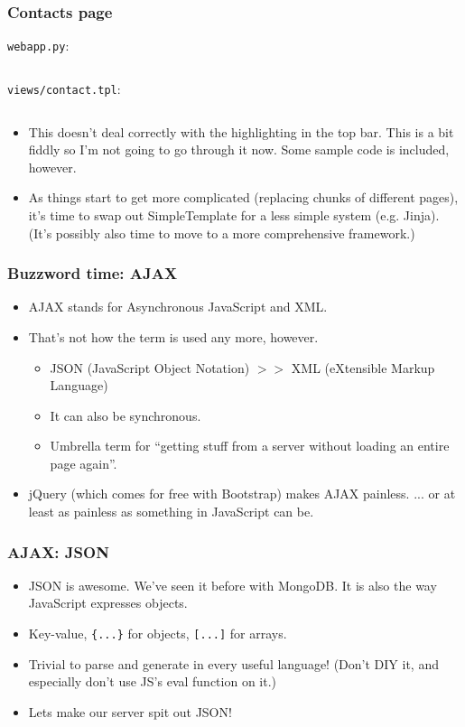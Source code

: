 \documentclass{beamer}
\begin{document}
\begin{frame}
  \frametitle{Contacts page}
  \texttt{webapp.py}:
  \inputminted[firstline=34,lastline=38]{python}{../steps/03-frontend/02-demo-app/webapp.py}
  \texttt{views/contact.tpl}:
  \inputminted{html}{../steps/03-frontend/02-demo-app/views/contact.tpl}
\end{frame}

\begin{frame}
  \begin{itemize}
  \item This doesn't deal correctly with the highlighting in the top
    bar. This is a bit fiddly so I'm not going to go through it
    now. Some sample code is included, however.
  \item As things start to get more complicated (replacing chunks of
    different pages), it's time to swap out SimpleTemplate for a less
    simple system (e.g. Jinja). (It's possibly also time to move to a
    more comprehensive framework.)
  \end{itemize}
\end{frame}

\begin{frame}
  \frametitle{Buzzword time: AJAX}
  \begin{itemize}
  \item AJAX stands for Asynchronous JavaScript and XML.
  \item That's not how the term is used any more, however.
    \begin{itemize}
    \item JSON (JavaScript Object Notation) $>>$ XML (eXtensible
      Markup Language)
    \item It can also be synchronous.
    \item Umbrella term for ``getting stuff from a server without
      loading an entire page again''.
    \end{itemize}
  \item jQuery (which comes for free with Bootstrap) makes AJAX
    painless. {\small ... or at least as painless as something in JavaScript can be.}
  \end{itemize}
\end{frame}

\begin{frame}[fragile]
  \frametitle{AJAX: JSON}
  \begin{itemize}
  \item JSON is awesome. We've seen it before with MongoDB. It is also
    the way JavaScript expresses objects.
  \item Key-value, \texttt{\{...\}} for objects, \texttt{[...]} for
    arrays.
  \item Trivial to parse and generate in every useful language! (Don't
    DIY it, and especially don't use JS's eval function on it.)
  \item Lets make our server spit out JSON!
  \end{itemize}
\end{frame}
\end{document}
